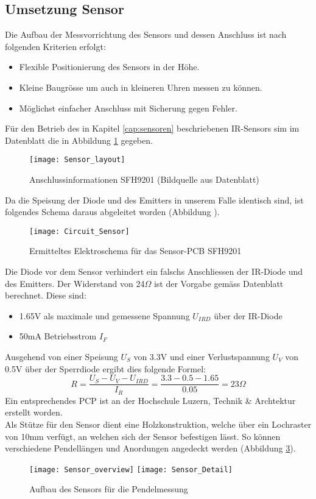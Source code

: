 \subsection{Umsetzung Sensor} %
	Die Aufbau der Messvorrichtung des Sensors und dessen Anschluss ist nach folgenden Kriterien erfolgt:
	\begin{itemize}
		\item Flexible Positionierung des Sensors in der Höhe.
		\item Kleine Baugrösse um auch in kleineren Uhren messen zu können.
		\item Möglichst einfacher Anschluss mit Sicherung gegen Fehler.
	\end{itemize}
	Für den Betrieb des in Kapitel \ref{cap:sensoren} beschriebenen IR-Sensors sim im Datenblatt die in Abbildung \ref{fig:info_SFH9201} gegeben.
	\begin{figure}[H]
		\centering
		\texttt{[image: Sensor\_layout]}
		\caption{Anschlussinformationen SFH9201 (Bildquelle aus Datenblatt)}
		\label{fig:info_SFH9201}
	\end{figure}
	Da die Speisung der Diode und des Emitters in unserem Falle identisch sind, ist folgendes Schema daraus abgeleitet worden (Abbildung ).
	\begin{figure}[H]
		\centering
		\texttt{[image: Circuit\_Sensor]}
		\caption{Ermitteltes Elektroschema für das Sensor-PCB SFH9201}
		\label{fig:schema_sensor}
	\end{figure}
	Die Diode vor dem Sensor verhindert ein falschs Anschliessen der IR-Diode und des Emitters. Der Widerstand von 24$\Omega$ ist der Vorgabe gemäss Datenblatt berechnet. Diese sind:
	\begin{itemize}
		\item 1.65V als maximale und gemessene Spannung $U_{IRD}$ über der IR-Diode
		\item 50mA Betriebsstrom $I_F$
	\end{itemize}
	Ausgehend von einer Speisung $U_S$ von 3.3V und einer Verlustspannung $U_V$ von 0.5V über der Sperrdiode ergibt dies folgende Formel:
	\[
		R = \frac{U_S - U_V - U_{IRD}}{I_R} = \frac{3.3 - 0.5 - 1.65}{0.05} = 23\Omega
	\]
	Ein entsprechendes PCP ist an der Hochschule Luzern, Technik \& Archtektur erstellt worden.\\
	Als Stütze für den Sensor dient eine Holzkonstruktion, welche über ein Lochraster von 10mm verfügt, an welchen sich der Sensor befestigen lässt. So können verschiedene Pendellängen und Anordungen angedeckt werden (Abbildung \ref{fig:Sensor_overview}).
	\begin{figure}[H]
		\centering
		\texttt{[image: Sensor\_overview]}
		\texttt{[image: Sensor\_Detail]}
		\caption{Aufbau des Sensors für die Pendelmessung}
		\label{fig:Sensor_overview}
	\end{figure}